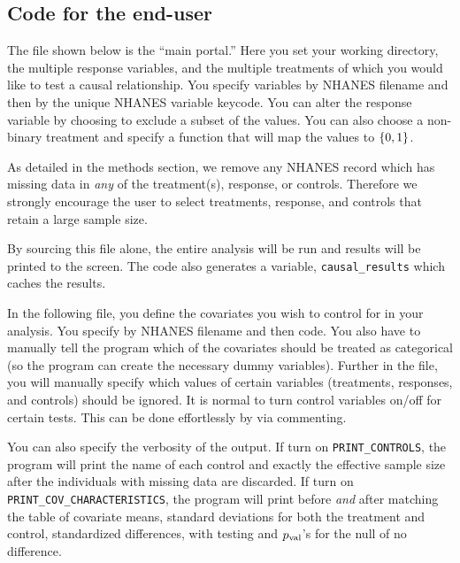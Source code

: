 \documentclass[12pt]{article}
\begin{document}
\subsection{Code for the end-user}

The file shown below is the ``main portal.'' Here you set your working directory, the multiple response variables, and the multiple treatments of which you would like to test a causal relationship. You specify variables by NHANES filename and then by the unique NHANES variable keycode. You can alter the response variable by choosing to exclude a subset of the values. You can also choose a non-binary treatment and specify a function that will map the values to $\left\{0, 1\right\}$.

As detailed in the methods section, we remove any NHANES record which has missing data in \textit{any} of the treatment(s), response, or controls. Therefore we strongly encourage the user to select treatments, response, and controls that retain a large sample size.

By sourcing this file alone, the entire analysis will be run and results will be printed to the screen. The code also generates a variable, \texttt{causal\_results} which caches the results.


\vspace{0.3cm}

In the following file, you define the covariates you wish to control for in your analysis. You specify by NHANES filename and then code. You also have to manually tell the program which of the covariates should be treated as categorical (so the program can create the necessary dummy variables). Further in the file, you will manually specify which values of certain variables (treatments, responses, and controls) should be ignored. It is normal to turn control variables on/off for certain tests. This can be done effortlessly by via commenting.

You can also specify the verbosity of the output. If turn on \texttt{PRINT\_CONTROLS}, the program will print the name of each control and exactly the effective sample size after the individuals with missing data are discarded. If turn on \texttt{PRINT\_COV\_CHARACTERISTICS}, the program will print before \textit{and} after matching the table of covariate means, standard deviations for both the treatment and control, standardized differences, with testing and $p_{\text{val}}$'s for the null of no difference.


\vspace{0.3cm}
\end{document}
